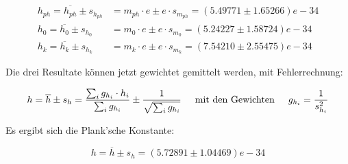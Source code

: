 \begin{align*}
    h_{ph} = \overline{h_{ph}} \pm s_{h_{ph}} &= m_{ph} \cdot e \pm e \cdot s_{m_{ph}} = \left(5.49771 \pm 1.65266\right)e-34 \\
    h_0    = \overline{h_0}    \pm s_{h_0}    &= m_0    \cdot e \pm e \cdot s_{m_0}    = \left(5.24227 \pm 1.58724\right)e-34 \\
    h_k    = \overline{h_k}    \pm s_{h_k}    &= m_k    \cdot e \pm e \cdot s_{m_k}    = \left(7.54210 \pm 2.55475\right)e-34
\end{align*}

Die   drei  Resultate  k\"onnen  jetzt   gewichtet   gemittelt   werden,   mit
Fehlerrechnung:

\begin{equation*}
    h = \overline{h} \pm s_h = \frac{\sum_i g_{h_i}\cdot h_i}{\sum_i g_{h_i}} \pm \frac{1}{\sqrt{\sum_i g_{h_i}}}
    \hspace{5mm}\textrm{mit den Gewichten}\hspace{5mm}
    g_{h_i} = \frac{1}{s_{h_i}^2}
\end{equation*}

Es ergibt sich die Plank'sche Konstante:

\begin{equation*}
    h = \overline{h} \pm s_h = \left(5.72891 \pm 1.04469\right)e-34
\end{equation*}

